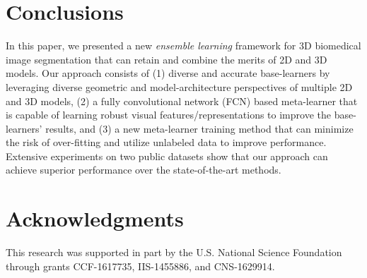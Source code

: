 \documentclass[letterpaper]{article} %
\begin{document}
\section{Conclusions}
In this paper, we presented a new {\em ensemble learning} framework for 3D biomedical image segmentation that can retain and combine the merits of 2D and 3D models. Our approach consists of (1) diverse and accurate base-learners by leveraging diverse geometric and model-architecture perspectives of multiple 2D and 3D models, (2) a fully convolutional network (FCN) based meta-learner that is capable of learning robust visual features/representations to improve the base-learners' results, and (3) a new meta-learner training method that can minimize the risk of over-fitting and utilize unlabeled data to improve performance. Extensive experiments on two public datasets show that our approach can achieve superior performance over the state-of-the-art methods.



\section{Acknowledgments}

This research was supported in part by the U.S. National Science Foundation through grants CCF-1617735, IIS-1455886, and CNS-1629914. 




\end{document}
